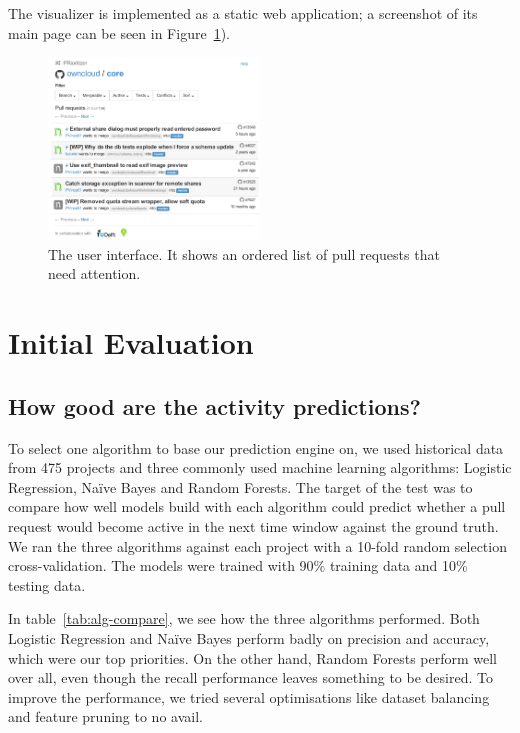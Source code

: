 \documentclass[conference]{IEEEtran}
\begin{document}
The visualizer is implemented as a static web application; a
screenshot of its main page can be seen in Figure~\ref{fig:ui}).

\begin{figure}
  \centering
  \includegraphics[width=0.5\textwidth]{../figs/interface.pdf}
  \caption[The user interface]
  {The user interface. It shows an ordered list of pull requests that need attention. }
  \label{fig:ui}
\end{figure}

\section{Initial Evaluation}
\label{sec:evaluation}

\subsection{How good are the activity predictions?}
\label{sec:learning}

To select one algorithm to base our prediction engine on, we used historical
data from 475 projects and three commonly used machine learning algorithms:
Logistic Regression, Na\"ive Bayes and Random Forests. The target of the test
was to compare how well models build with each algorithm could predict whether a
pull request would become active in the next time window against the ground
truth.  We ran the three algorithms against each project with a 10-fold random
selection cross-validation. The models were trained with 90\% training data and
10\% testing data.

In table~\ref{tab:alg-compare}, we see how the three algorithms performed. Both
Logistic Regression and Na\"ive Bayes perform badly on precision and accuracy,
which were our top priorities.  On the other hand, Random Forests perform well
over all, even though the recall performance leaves something to be desired. To
improve the performance, we tried several optimisations like dataset balancing
and feature pruning to no avail.
\end{document}
